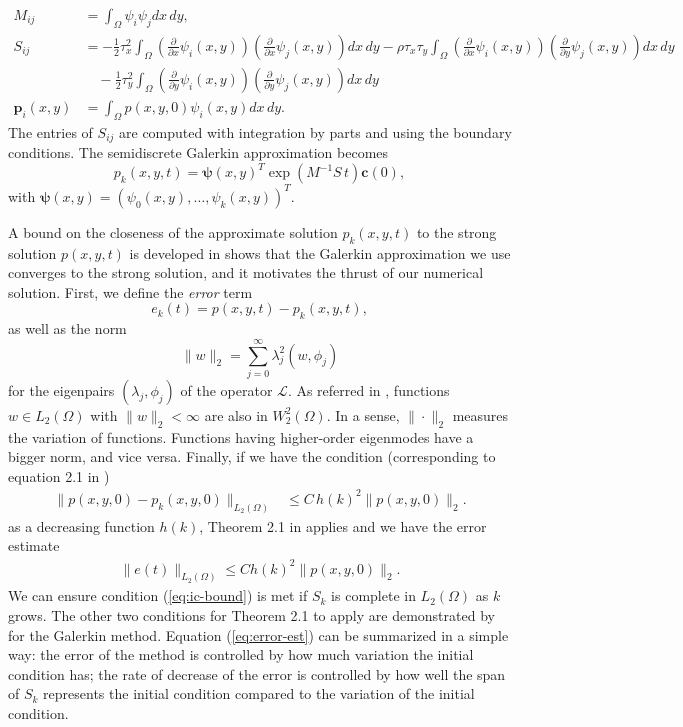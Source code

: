 \documentclass[10pt]{article}
\begin{document}
\begin{align*}
  M_{ij} &= \displaystyle \int_\Omega \psi_i \psi_j dx\,dy, \\
  S_{ij} &= -\frac{1}{2}\tau_x^2 \displaystyle \int_\Omega \left( \frac{\partial}{\partial x} \psi_i(x,y) \right) \left( \frac{\partial}{\partial x} \psi_j(x,y) \right) dx\,dy -\rho\tau_x\tau_y \displaystyle \int_\Omega \left( \frac{\partial}{\partial x} \psi_i(x,y) \right) \left( \frac{\partial}{\partial y} \psi_j(x,y) \right) dx\,dy \\
         &\quad -\frac{1}{2}\tau_y^2 \displaystyle \int_\Omega \left( \frac{\partial}{\partial y} \psi_i(x,y) \right) \left( \frac{\partial}{\partial y} \psi_j(x,y) \right) dx\,dy \\
  \mathbf{p}_i(x,y) &= \displaystyle \int_\Omega p(x,y,0) \psi_i(x,y) dx\,dy.
\end{align*}
The entries of $S_{ij}$ are computed with integration by parts and
using the boundary conditions. The semidiscrete Galerkin approximation
becomes
\[
  p_k(x,y,t) = \boldsymbol{\psi}(x,y)^T \exp\left( M^{-1}S\, t \right) \mathbf{c}(0),
\]
with $\boldsymbol{\psi}(x,y) = (\psi_0(x,y), \ldots, \psi_k(x,y))^T.$

A bound on the closeness of the approximate solution $p_k(x,y,t)$ to
the strong solution $p(x,y,t)$ is developed in \cite{bramble1977some}
shows that the Galerkin approximation we use converges to the strong
solution, and it motivates the thrust of our numerical
solution. First, we define the \textit{error} term
\[
  e_k(t) = p(x,y,t) - p_k(x,y,t),
\]
as well as the norm
\[
  \| w \|_2 = \sum_{j=0}^\infty \lambda_j^2 (w, \phi_j)
\]
for the eigenpairs $(\lambda_j, \phi_j)$ of the operator
$\mathcal{L}$. As referred in \cite{bramble1977some}, functions
$w \in L_2(\Omega)$ with $\|w\|_2 < \infty$ are also in $W_2^2(\Omega)$. In a
sense, $\| \cdot \|_2$ measures the variation of functions. Functions
having higher-order eigenmodes have a bigger norm, and vice
versa. Finally, if we have the condition (corresponding to equation
2.1 in \cite{bramble1977some})
\begin{align}
  \| p(x,y,0) - p_k(x,y,0) \|_{L_2(\Omega)} &\leq C\, h(k)^2 \| p(x,y,0) \|_2. \label{eq:ic-bound}
\end{align}
as a decreasing function $h(k)$, Theorem 2.1 in \cite{bramble1977some}
applies and we have the error estimate
\begin{align}
  \| e(t) \|_{L_2(\Omega)} \leq C h(k)^2 \| p(x,y,0) \|_{2}. \label{eq:error-est}
\end{align}
We can ensure condition (\ref{eq:ic-bound}) is met if $S_k$ is complete
in $L_2(\Omega)$ as $k$ grows. The other two conditions for Theorem
2.1 to apply are demonstrated by \cite{bramble1977some} for the
Galerkin method. Equation (\ref{eq:error-est}) can be summarized in a
simple way: the error of the method is controlled by how much
variation the initial condition has; the rate of decrease of the error
is controlled by how well the span of $S_k$ represents the initial
condition compared to the variation of the initial condition.
\end{document}
